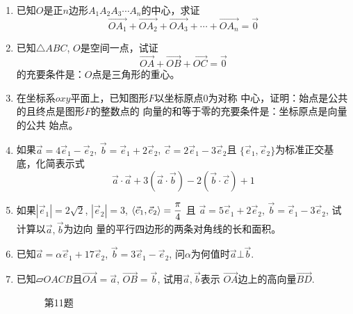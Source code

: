 \begin{enumerate}
\item 已知$O$是正$n$边形$A_1A_2A_3\cdots A_n$的中心，求证
\[\Vec{OA_1}+\Vec{OA_2}+\Vec{OA_3}+\cdots+\Vec{OA_n}=\vec{0}\]
\item 已知$\triangle ABC$, $O$是空间一点，试证
\[\Vec{OA}+\Vec{OB}+\Vec{OC}=\vec{0}\]
的充要条件是：$O$点是三角形的重心。
\item 在坐标系$oxy$平面上，已知图形$F$以坐标原点0为对称
中心，证明：始点是公共的且终点是图形$F$的整数点的
向量的和等于零的充要条件是：坐标原点是向量的公共
始点。

\item 如果$\vec{a}=4\vec{e}_1-\vec{e}_2$, $\vec{b}=\vec{e}_1+2\vec{e}_2$, $\vec{c}=2\vec{e}_1-3\vec{e}_2$且
$\{\vec{e}_1,\vec{e}_2\}$为标准正交基底，化简表示式
\[\vec{a}\cdot \vec{a}+3(\vec{a}\cdot \vec{b})-2(\vec{b}\cdot \vec{c})+1\]
\item 如果$|\vec{e}_1|=2\sqrt{2}$, $|\vec{e}_2|=3$, $\left\langle \vec{e}_1,\vec{e}_2 \right\rangle=\dfrac{\pi}{4}$
且
$\vec{a}=5\vec{e}_1+2\vec{e}_2$, $\vec{b}=\vec{e}_1-3\vec{e}_2$, 试计算以$\vec{a},\vec{b}$为边向
量的平行四边形的两条对角线的长和面积。


\item 已知$\vec{a}=\alpha \vec{e}_1+17\vec{e}_2$, $\vec{b}=3\vec{e}_1-\vec{e}_2$, 问$\alpha$为何值时$\vec{a}\bot\vec{b}$.

\item 已知$\parallelogram{OACB}$且$\Vec{OA}=\vec{a}$, 
$\Vec{OB}=\vec{b}$, 试用$\vec{a},\vec{b}$表示
$\Vec{OA}$边上的高向量$\Vec{BD}$.
\begin{figure}[htp]
    \centering
{}

    \caption*{第11题}
\end{figure}
\end{enumerate}
